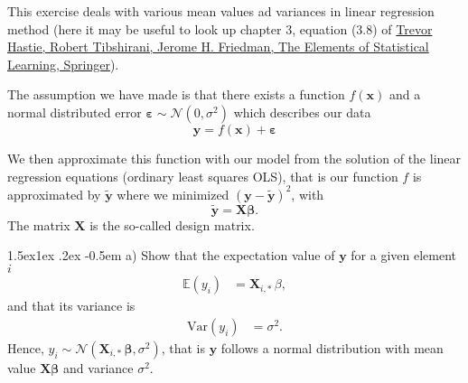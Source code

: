 \documentclass[%
oneside,                 %
final,                   %
10pt]{article}
\makeatletter
\newenvironment{doconceexercise}{}{}
\newcounter{doconceexercisecounter}
\newcommand\subex{\@startsection{paragraph}{4}{\z@}%
                  {1.5ex\@plus1ex \@minus.2ex}%
                  {-0.5em}%
                  {\normalfont\normalsize\bfseries}}
\makeatother
\begin{document}
\begin{doconceexercise}

                             

This exercise deals with various mean values ad variances in  linear regression method (here it may be useful to look up chapter 3, equation (3.8) of \href{{https://www.springer.com/gp/book/9780387848570}}{Trevor Hastie, Robert Tibshirani, Jerome H. Friedman, The Elements of Statistical Learning, Springer}).

The assumption we have made is 
that there exists a function $f(\bm{x})$ and  a normal distributed error $\bm{\varepsilon}\sim \mathcal{N}(0, \sigma^2)$
which describes our data
\[
\bm{y} = f(\bm{x})+\bm{\varepsilon}
\]

We then approximate this function with our model from the solution of the linear regression equations (ordinary least squares OLS), that is our
function $f$ is approximated by $\bm{\tilde{y}}$ where we minimized  $(\bm{y}-\bm{\tilde{y}})^2$, with
\[
\bm{\tilde{y}} = \bm{X}\bm{\beta}.
\]
The matrix $\bm{X}$ is the so-called design matrix.


\subex{a)}
Show that  the expectation value of $\bm{y}$ for a given element $i$ 
\begin{align*} 
\mathbb{E}(y_i) & =\mathbf{X}_{i, \ast} \, \beta, 
\end{align*} 
and that
its variance is 
\begin{align*} \mbox{Var}(y_i) & = \sigma^2.  
\end{align*}
Hence, $y_i \sim \mathcal{N}( \mathbf{X}_{i, \ast} \, \bm{\beta}, \sigma^2)$, that is $\bm{y}$ follows a normal distribution with 
mean value $\bm{X}\bm{\beta}$ and variance $\sigma^2$.



\end{doconceexercise}
\end{document}
